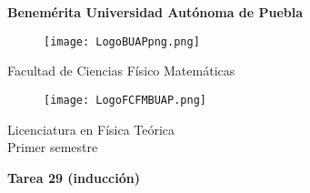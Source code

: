 \documentclass[12pt]{article}
\begin{document}
\begingroup
\begin{titlepage}
	\noindent
	\vspace{1mm}
\end{titlepage}
\endgroup

\pagestyle{empty} 
\setlength{\parindent}{0pt}
\sffamily


\begin{center} 

    \LARGE{\bf{\textsf{Benemérita Universidad Autónoma de Puebla}}} \\[0.5cm]
    
\begin{figure}[htb] \centering

    \texttt{[image: LogoBUAPpng.png]} 

\end{figure}


    \LARGE{Facultad de Ciencias Físico Matemáticas}\\[0.5cm]

\begin{figure}[htb] \centering

    \texttt{[image: LogoFCFMBUAP.png]} 
    
\end{figure} 


    \Large{Licenciatura en Física Teórica}\\[0.5cm]
    \Large{Primer semestre} 

\end{center} \vspace{0.3cm}

\begin{center}

    {\Large{\bfseries{{\textcolor{carrotorange}{Tarea 29 (inducción)}}}}} \\ 
    
\end{center}
\end{document}
